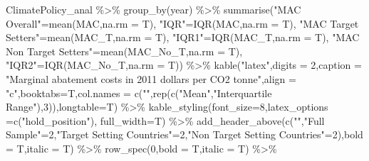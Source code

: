 \documentclass[
  letterpaper,
  DIV=11,
  numbers=noendperiod]{scrartcl}
\newenvironment{Shaded}{\begin{snugshade}}{\end{snugshade}}
\newcommand{\AttributeTok}[1]{\textcolor[rgb]{0.40,0.46,0.14}{#1}}
\newcommand{\DecValTok}[1]{\textcolor[rgb]{0.68,0.00,0.00}{#1}}
\newcommand{\FunctionTok}[1]{\textcolor[rgb]{0.28,0.35,0.67}{#1}}
\newcommand{\NormalTok}[1]{\textcolor[rgb]{0.00,0.46,0.62}{#1}}
\newcommand{\OtherTok}[1]{\textcolor[rgb]{0.00,0.46,0.62}{#1}}
\newcommand{\SpecialCharTok}[1]{\textcolor[rgb]{0.37,0.37,0.37}{#1}}
\newcommand{\StringTok}[1]{\textcolor[rgb]{0.13,0.47,0.30}{#1}}
\begin{document}
\begin{Shaded}
\begin{Highlighting}[]
\NormalTok{ClimatePolicy\_anal }\SpecialCharTok{\%\textgreater{}\%} 
  \FunctionTok{group\_by}\NormalTok{(year) }\SpecialCharTok{\%\textgreater{}\%}
  \FunctionTok{summarise}\NormalTok{(}\StringTok{"MAC Overall"}\OtherTok{=}\FunctionTok{mean}\NormalTok{(MAC,}\AttributeTok{na.rm =}\NormalTok{ T),}
            \StringTok{"IQR"}\OtherTok{=}\FunctionTok{IQR}\NormalTok{(MAC,}\AttributeTok{na.rm =}\NormalTok{ T),}
            \StringTok{"MAC Target Setters"}\OtherTok{=}\FunctionTok{mean}\NormalTok{(MAC\_T,}\AttributeTok{na.rm =}\NormalTok{ T),}
            \StringTok{"IQR1"}\OtherTok{=}\FunctionTok{IQR}\NormalTok{(MAC\_T,}\AttributeTok{na.rm =}\NormalTok{ T),}
            \StringTok{"MAC Non Target Setters"}\OtherTok{=}\FunctionTok{mean}\NormalTok{(MAC\_No\_T,}\AttributeTok{na.rm =}\NormalTok{ T),}
            \StringTok{"IQR2"}\OtherTok{=}\FunctionTok{IQR}\NormalTok{(MAC\_No\_T,}\AttributeTok{na.rm =}\NormalTok{ T)) }\SpecialCharTok{\%\textgreater{}\%}
  \FunctionTok{kable}\NormalTok{(}\StringTok{"latex"}\NormalTok{,}\AttributeTok{digits =} \DecValTok{2}\NormalTok{,}\AttributeTok{caption =} \StringTok{"Marginal abatement costs in 2011 dollars per CO2 tonne"}\NormalTok{,}\AttributeTok{align =} \StringTok{"c"}\NormalTok{,}\AttributeTok{booktabs=}\NormalTok{T,}\AttributeTok{col.names =} \FunctionTok{c}\NormalTok{(}\StringTok{""}\NormalTok{,}\FunctionTok{rep}\NormalTok{(}\FunctionTok{c}\NormalTok{(}\StringTok{"Mean"}\NormalTok{,}\StringTok{"Interquartile Range"}\NormalTok{),}\DecValTok{3}\NormalTok{)),}\AttributeTok{longtable=}\NormalTok{T) }\SpecialCharTok{\%\textgreater{}\%}
  \FunctionTok{kable\_styling}\NormalTok{(}\AttributeTok{font\_size=}\DecValTok{8}\NormalTok{,}\AttributeTok{latex\_options =}\FunctionTok{c}\NormalTok{(}\StringTok{"hold\_position"}\NormalTok{), }\AttributeTok{full\_width=}\NormalTok{T) }\SpecialCharTok{\%\textgreater{}\%}
  \FunctionTok{add\_header\_above}\NormalTok{(}\FunctionTok{c}\NormalTok{(}\StringTok{""}\NormalTok{,}\StringTok{"Full Sample"}\OtherTok{=}\DecValTok{2}\NormalTok{,}\StringTok{"Target Setting Countries"}\OtherTok{=}\DecValTok{2}\NormalTok{,}\StringTok{"Non Target Setting Countries"}\OtherTok{=}\DecValTok{2}\NormalTok{),}\AttributeTok{bold =}\NormalTok{ T,}\AttributeTok{italic =}\NormalTok{ T) }\SpecialCharTok{\%\textgreater{}\%}
  \FunctionTok{row\_spec}\NormalTok{(}\DecValTok{0}\NormalTok{,}\AttributeTok{bold =}\NormalTok{ T,}\AttributeTok{italic =}\NormalTok{ T)  }\SpecialCharTok{\%\textgreater{}\%}

\end{Highlighting}
\end{Shaded}
\end{document}

